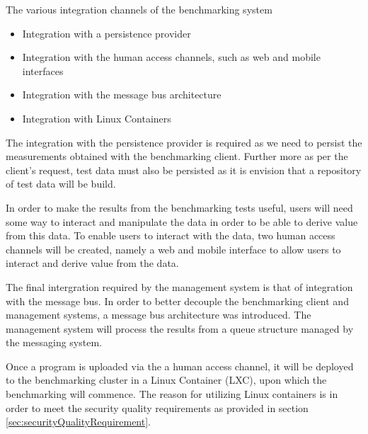 The various integration channels of the benchmarking system
\begin{itemize}
	\item Integration with a persistence provider
	\item Integration with the human access channels, such as web and
		mobile interfaces 
	\item Integration with the message bus architecture
	\item Integration with Linux Containers
\end{itemize}

The integration with the persistence provider is required as we need to persist
the measurements obtained with the benchmarking client. Further more as per the
client's request, test data must also be persisted as it is envision that a
repository of test data will be build.

In order to make the results from the benchmarking tests useful, users will
need some way to interact and manipulate the data in order to be able to
derive value from this data. To enable users to interact with the data,
two human access channels will be created, namely a web and mobile interface
to allow users to interact and derive value from the data.

The final intergration required by the management system is that of integration
with the message bus. In order to better decouple the benchmarking client and
management systems, a message bus architecture was introduced. The management
system will process the results from a queue structure managed by the messaging
system. 

Once a program is uploaded via the a human access channel, it will be deployed
to the benchmarking cluster in a Linux Container (LXC), upon which the
benchmarking will commence.  The reason for utilizing Linux containers is in
order to meet the security quality requirements as provided in
section \ref{sec:securityQualityRequirement}.

